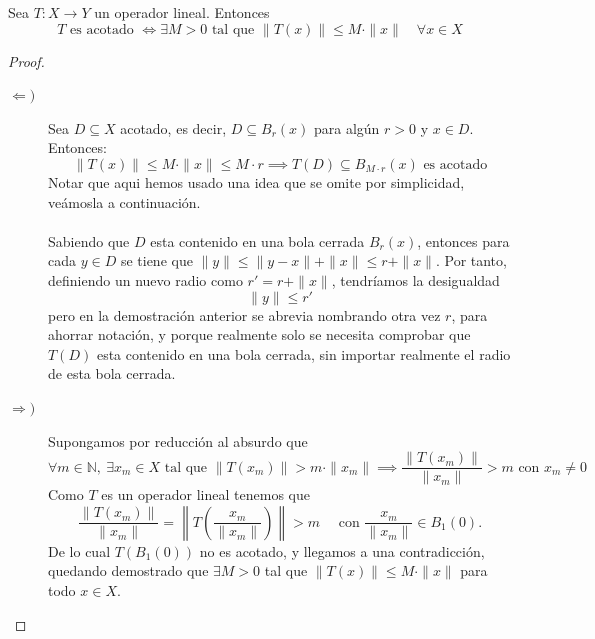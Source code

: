 \begin{prop}
    Sea $T: X \longrightarrow Y$ un operador lineal. Entonces 
    \begin{equation*}
        T \text{ es acotado } \iff \exists M > 0 \text{ tal que } \|T(x)\| \leq M \cdot \|x\| \quad \forall x \in X
    \end{equation*}
\begin{proof}
    \begin{description}
        \item[$\Longleftarrow)$]     Sea $D \subseteq X$ acotado, es decir, $D \subseteq B_r(x)$ para algún $r > 0$ y $x \in D$. Entonces:
        \begin{equation*}
            \|T(x)\| \leq M \cdot \|x\| \leq M \cdot r \implies T(D) \subseteq B_{M \cdot r}(x) \text{ es acotado}
        \end{equation*}
        Notar que aqui hemos usado una idea que se omite por simplicidad, veámosla a continuación. \\ \\
        \noindent
        Sabiendo que $D$ esta contenido en una bola cerrada $B_r(x)$, entonces para cada $y \in D$ se tiene que $\|y\| \leq \|y-x\| + \|x\| \leq r + \|x\|$. Por tanto, definiendo un nuevo radio como $r'=r + \|x\|$, tendríamos la desigualdad 
        \begin{equation*}
            \|y\| \leq r' 
        \end{equation*}
        pero en la demostración anterior se abrevia nombrando otra vez $r$, para ahorrar notación, y porque realmente solo se necesita comprobar que $T(D)$ esta contenido en una bola cerrada, sin importar realmente el radio de esta bola cerrada.
        \item[$\Longrightarrow)$] Supongamos por reducción al absurdo que 
        $$\forall m \in \mathbb{N}, \ \exists x_m \in X \text{ tal que } \|T(x_m)\| > m \cdot \|x_m\| \implies \frac{\|T(x_m)\|}{\|x_m\|} > m \text{ con } x_m \neq 0$$
        Como $T$ es un operador lineal  tenemos que  
        \begin{equation*}
            \frac{\|T(x_m)\|}{\|x_m\|} = \left\|T\left(\frac{x_m}{\|x_m\|}\right)\right\| > m \quad \text{ con } \frac{x_m}{\|x_m\|} \in B_1(0). 
        \end{equation*}
        De lo cual $T(B_1(0))$ no es acotado, y llegamos a una contradicción, quedando demostrado que $\exists M > 0$ tal que $\|T(x)\| \leq M \cdot \|x\|$ para todo $x \in X$.
    \end{description}
\end{proof}
\end{prop}

